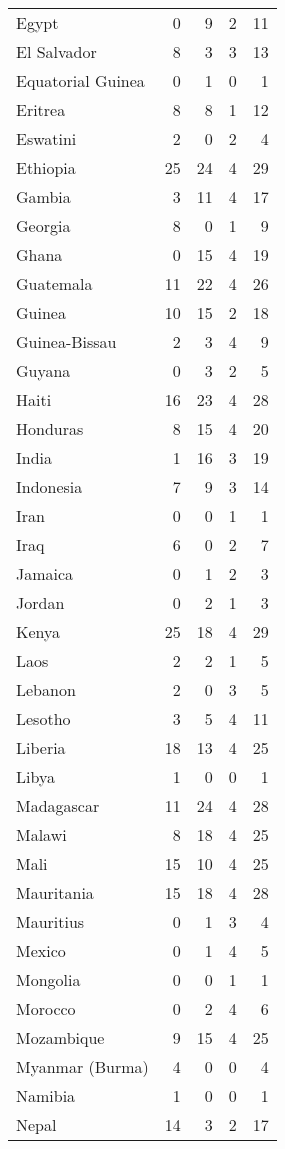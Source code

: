 \begin{longtable}[t]{lrrrr}
Egypt & 0 & 9 & 2 & 11\\
El Salvador & 8 & 3 & 3 & 13\\
Equatorial Guinea & 0 & 1 & 0 & 1\\
Eritrea & 8 & 8 & 1 & 12\\
Eswatini & 2 & 0 & 2 & 4\\
Ethiopia & 25 & 24 & 4 & 29\\
Gambia & 3 & 11 & 4 & 17\\
Georgia & 8 & 0 & 1 & 9\\
Ghana & 0 & 15 & 4 & 19\\
Guatemala & 11 & 22 & 4 & 26\\
Guinea & 10 & 15 & 2 & 18\\
Guinea-Bissau & 2 & 3 & 4 & 9\\
Guyana & 0 & 3 & 2 & 5\\
Haiti & 16 & 23 & 4 & 28\\
Honduras & 8 & 15 & 4 & 20\\
India & 1 & 16 & 3 & 19\\
Indonesia & 7 & 9 & 3 & 14\\
Iran & 0 & 0 & 1 & 1\\
Iraq & 6 & 0 & 2 & 7\\
Jamaica & 0 & 1 & 2 & 3\\
Jordan & 0 & 2 & 1 & 3\\
Kenya & 25 & 18 & 4 & 29\\
Laos & 2 & 2 & 1 & 5\\
Lebanon & 2 & 0 & 3 & 5\\
Lesotho & 3 & 5 & 4 & 11\\
Liberia & 18 & 13 & 4 & 25\\
Libya & 1 & 0 & 0 & 1\\
Madagascar & 11 & 24 & 4 & 28\\
Malawi & 8 & 18 & 4 & 25\\
Mali & 15 & 10 & 4 & 25\\
Mauritania & 15 & 18 & 4 & 28\\
Mauritius & 0 & 1 & 3 & 4\\
Mexico & 0 & 1 & 4 & 5\\
Mongolia & 0 & 0 & 1 & 1\\
Morocco & 0 & 2 & 4 & 6\\
Mozambique & 9 & 15 & 4 & 25\\
Myanmar (Burma) & 4 & 0 & 0 & 4\\
Namibia & 1 & 0 & 0 & 1\\
Nepal & 14 & 3 & 2 & 17\\

\end{longtable}
